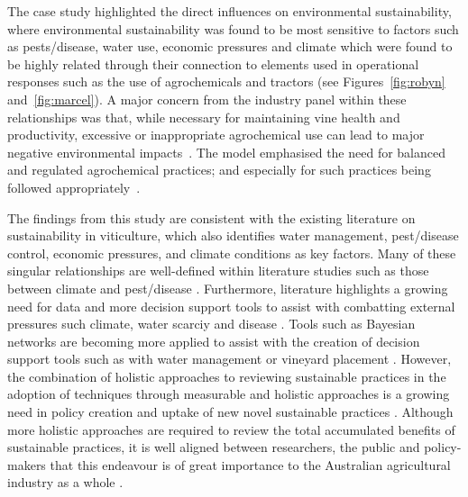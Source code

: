 The case study highlighted the direct influences on environmental sustainability, where environmental sustainability was found to be most sensitive to factors such as pests/disease, water use, economic pressures and climate which were found to be highly related through their connection to elements used in operational responses such as the use of agrochemicals and tractors (see Figures~\ref{fig:robyn} and~\ref{fig:marcel}). A major concern from the industry panel within these relationships was that, while necessary for maintaining vine health and productivity, excessive or inappropriate agrochemical use can lead to major negative environmental impacts~\cite{alonsogonzalezUnveilingTerroirEvaluating2024,manjarres-lopezAssessmentPesticideResidues2021}. The model emphasised the need for balanced and regulated agrochemical practices; and especially for such practices being followed appropriately~\cite{baianoOverviewSustainabilityWine2021}.


The findings from this study are consistent with the existing literature on sustainability in viticulture, which also identifies water management, pest/disease control, economic pressures, and climate conditions as key factors. Many of these singular relationships are well-defined within literature studies such as those between climate and pest/disease \cite{olatinwoChapterWeatherbasedPest2014}. Furthermore, literature  highlights a growing need for data and more decision support tools to assist with combatting external pressures such climate, water scarciy and disease \cite{naigeonDATADecisionmakingViticulture2023,stefaniniBayesianCausalModel2022,fincoCombiningPrecisionViticulture2022a,laurentLocalInfluenceClimate2022}. Tools such as Bayesian networks are becoming more applied to assist with the creation of decision support tools such as with water management \cite{carmonaUseParticipatoryObjectOriented2011} or vineyard placement \cite{abbalDecisionSupportSystem2016}. However, the combination of holistic approaches to reviewing sustainable practices in the adoption of techniques through measurable and holistic approaches is a growing need in policy creation and uptake of new novel sustainable practices \autocite{mayfieldDesigningExpertledBayesian2023,baianoOverviewSustainabilityWine2021,dichiaraCollaborativeApproachAchieving2024}. Although more holistic approaches are required to review the total accumulated benefits of sustainable practices, it is well aligned between researchers, the public and policy-makers that this endeavour is of great importance to the Australian agricultural industry as a whole \cite{dumbrellComparingAustralianPublic2024}.

